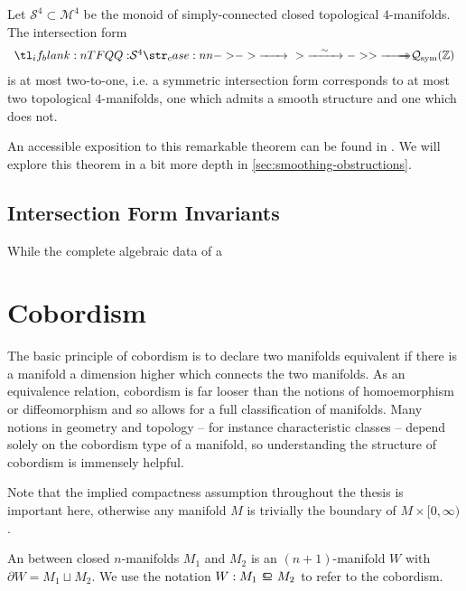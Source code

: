\begin{theorem}[Freedman, 1982] Let $\mathcal{S}^4\subset \mathcal{M}^4$ be the monoid of simply-connected closed topological $4$-manifolds. The intersection form
	\[
		\lkxfunc{Q}{\mathcal{S}^4}{\mathcal{Q}_{\mathrm{sym}}(\Z)}
	\]
	is at most two-to-one, i.e. a symmetric intersection form corresponds to at most two topological $4$-manifolds, one which admits a smooth structure and one which does not.
\end{theorem}
An accessible exposition to this remarkable theorem can be found in \cite{behrens2021discembedding}. We will explore this theorem in a bit more depth in \cref{sec:smoothing-obstructions}.

\subsection{Intersection Form Invariants}\label{sec:intersection-form-invarians}

While the complete algebraic data of a


\medskip
{}

\pagebreak
\section{Cobordism}\label{sec:cobordism}

The basic principle of cobordism is to declare two manifolds equivalent if there is a manifold a dimension higher which connects the two manifolds. As an equivalence relation, cobordism is far looser than the notions of homoemorphism or diffeomorphism and so allows for a full classification of manifolds. Many notions in geometry and topology -- for instance characteristic classes -- depend solely on the cobordism type of a manifold, so understanding the structure of cobordism is immensely helpful.

\begin{remark}
	Note that the implied compactness assumption throughout the thesis is important here, otherwise any manifold $M$ is trivially the boundary of $M\times [0,\infty)$.
\end{remark}

\begin{definition}
	An  between closed $n$-manifolds $M_1$ and $M_2$ is an $(n+1)$-manifold $W$ with $\partial W = M_1\sqcup M_2$. We use the notation $W : M_1\bord M_2$ to refer to the cobordism.
\end{definition}

